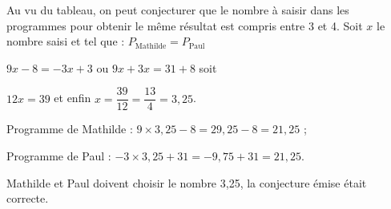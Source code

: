 %
%	
Au vu du tableau, on peut conjecturer que le nombre à saisir dans les programmes pour
obtenir le même résultat est compris entre 3 et 4.
Soit $x$ le nombre saisi et tel que : $P_{\text{Mathilde}} = P_{\text{Paul}}$

$9x - 8 = - 3x + 3$ ou $9x + 3x = 31 + 8$ soit

$12x = 39$ et enfin $x = \dfrac{39}{12} = \dfrac{13}{4} = 3,25$.

Programme de Mathilde : $9 \times 3,25 - 8 = 29,25 - 8 = 21,25$ ;

Programme de Paul : $- 3 \times  3,25 + 31 = - 9,75 + 31 = 21,25$.

Mathilde et Paul doivent choisir le nombre 3,25, la conjecture émise était correcte.

\vspace{0,5cm}

